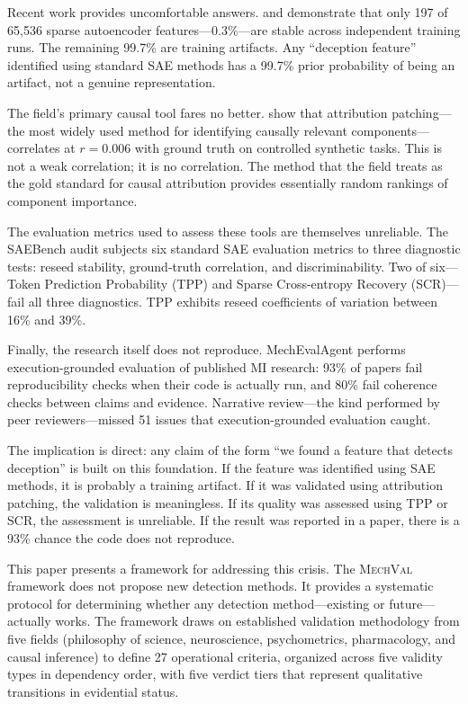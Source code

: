 \documentclass[10pt]{article}
\newcommand{\mechval}{\textsc{MechVal}}
\begin{document}
Recent work provides uncomfortable answers. \citet{bricken2024monosemanticity} and \citet{engels2025not} demonstrate that only 197 of 65,536 sparse autoencoder features---0.3\%---are stable across independent training runs. The remaining 99.7\% are training artifacts. Any ``deception feature'' identified using standard SAE methods has a 99.7\% prior probability of being an artifact, not a genuine representation.

The field's primary causal tool fares no better. \citet{kramar2024atp} show that attribution patching---the most widely used method for identifying causally relevant components---correlates at $r = 0.006$ with ground truth on controlled synthetic tasks. This is not a weak correlation; it is no correlation. The method that the field treats as the gold standard for causal attribution provides essentially random rankings of component importance.

The evaluation metrics used to assess these tools are themselves unreliable. The SAEBench audit subjects six standard SAE evaluation metrics to three diagnostic tests: reseed stability, ground-truth correlation, and discriminability. Two of six---Token Prediction Probability (TPP) and Sparse Cross-entropy Recovery (SCR)---fail all three diagnostics. TPP exhibits reseed coefficients of variation between 16\% and 39\%.

Finally, the research itself does not reproduce. MechEvalAgent \citep{bai2026mecheval} performs execution-grounded evaluation of published MI research: 93\% of papers fail reproducibility checks when their code is actually run, and 80\% fail coherence checks between claims and evidence. Narrative review---the kind performed by peer reviewers---missed 51 issues that execution-grounded evaluation caught.

The implication is direct: any claim of the form ``we found a feature that detects deception'' is built on this foundation. If the feature was identified using SAE methods, it is probably a training artifact. If it was validated using attribution patching, the validation is meaningless. If its quality was assessed using TPP or SCR, the assessment is unreliable. If the result was reported in a paper, there is a 93\% chance the code does not reproduce.

This paper presents a framework for addressing this crisis. The \mechval{} framework does not propose new detection methods. It provides a systematic protocol for determining whether any detection method---existing or future---actually works. The framework draws on established validation methodology from five fields (philosophy of science, neuroscience, psychometrics, pharmacology, and causal inference) to define 27 operational criteria, organized across five validity types in dependency order, with five verdict tiers that represent qualitative transitions in evidential status.
\end{document}
